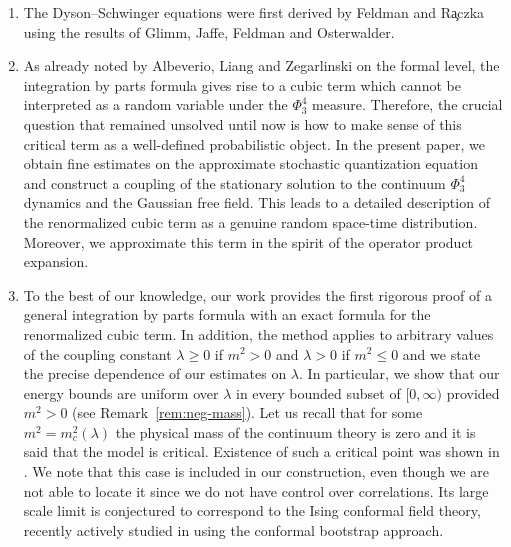 \documentclass[a4paper,11pt]{article}
\numberwithin{equation}{section}
\begin{document}
\begin{remark}
\begin{enumerate}
    \item The Dyson--Schwinger equations were  first derived by Feldman
    and R{\c{a}}czka~{\cite{feldman77}} using the results of Glimm,
    Jaffe, Feldman and Osterwalder.
    
    \item As already noted by Albeverio, Liang and Zegarlinski
    {\cite{albeverio_remark_2006}} on the formal level, the integration by
    parts formula gives rise to a cubic term which cannot be interpreted as a
    random variable under the $\Phi^4_3$ measure. Therefore, the crucial
    question that remained unsolved until now is how to make sense of this
    critical term as a well-defined probabilistic object. In the present
    paper, we obtain fine estimates on the approximate stochastic quantization
    equation and construct a coupling of the stationary solution to the
    continuum $\Phi^4_3$ dynamics and the Gaussian free field. This leads to a
    detailed description of the renormalized cubic term as a genuine random
    space-time distribution. Moreover, we approximate this term in the spirit
    of the operator product expansion.
    
    \item To the best of our knowledge, our work provides the first rigorous
    proof of a general integration by parts formula with an exact formula for
    the renormalized cubic term. In addition, the method applies to arbitrary
    values of the coupling constant $\lambda \geqslant 0$ if $m^2 > 0$ and
    $\lambda > 0$ if $m^2 \leqslant 0$  and we state the precise dependence of our
    estimates on $\lambda$. In particular, we show that our energy bounds are
    uniform over $\lambda$ in every bounded subset of $[0, \infty)$ provided $m^2 >0$ (see Remark~\ref{rem:neg-mass}). Let us recall  that for some $m^{2}=m_{c}^{2}(\lambda)$ %
     the physical mass of the continuum theory is zero and it is said that the model is critical. Existence of such a critical point was shown in \cite[Section 9, Part (4)]{MR723546}. We note that this case is included in our construction, even though we are not able to locate it since we do not have control over correlations. Its large scale limit  is conjectured to correspond to the Ising conformal field theory, recently  actively studied in \cite{MR3942977} using the conformal bootstrap approach.
    
%    
    

\end{enumerate}
\end{remark}
\end{document}
